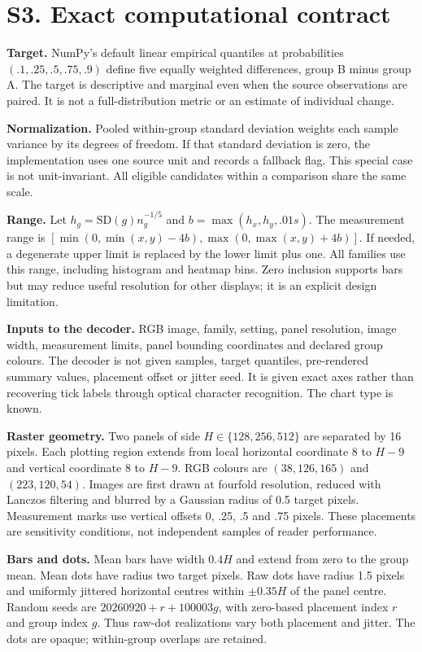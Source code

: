 \documentclass[10pt]{article}
\begin{document}
\section*{S3. Exact computational contract}
\textbf{Target.} NumPy's default linear empirical quantiles at probabilities $(.1,.25,.5,.75,.9)$ define five equally weighted differences, group B minus group A. The target is descriptive and marginal even when the source observations are paired. It is not a full-distribution metric or an estimate of individual change.

\textbf{Normalization.} Pooled within-group standard deviation weights each sample variance by its degrees of freedom. If that standard deviation is zero, the implementation uses one source unit and records a fallback flag. This special case is not unit-invariant. All eligible candidates within a comparison share the same scale.

\textbf{Range.} Let $h_g=\mathrm{SD}(g)n_g^{-1/5}$ and $b=\max(h_x,h_y,.01s)$. The measurement range is $[\min(0,\min(x,y)-4b),\max(0,\max(x,y)+4b)]$. If needed, a degenerate upper limit is replaced by the lower limit plus one. All families use this range, including histogram and heatmap bins. Zero inclusion supports bars but may reduce useful resolution for other displays; it is an explicit design limitation.

\textbf{Inputs to the decoder.} RGB image, family, setting, panel resolution, image width, measurement limits, panel bounding coordinates and declared group colours. The decoder is not given samples, target quantiles, pre-rendered summary values, placement offset or jitter seed. It is given exact axes rather than recovering tick labels through optical character recognition. The chart type is known.

\textbf{Raster geometry.} Two panels of side $H\in\{128,256,512\}$ are separated by 16 pixels. Each plotting region extends from local horizontal coordinate 8 to $H-9$ and vertical coordinate 8 to $H-9$. RGB colours are $(38,126,165)$ and $(223,120,54)$. Images are first drawn at fourfold resolution, reduced with Lanczos filtering and blurred by a Gaussian radius of 0.5 target pixels. Measurement marks use vertical offsets 0, .25, .5 and .75 pixels. These placements are sensitivity conditions, not independent samples of reader performance.

\textbf{Bars and dots.} Mean bars have width $0.4H$ and extend from zero to the group mean. Mean dots have radius two target pixels. Raw dots have radius 1.5 pixels and uniformly jittered horizontal centres within $\pm0.35H$ of the panel centre. Random seeds are $20260920+r+100003g$, with zero-based placement index $r$ and group index $g$. Thus raw-dot realizations vary both placement and jitter. The dots are opaque; within-group overlaps are retained.
\end{document}
